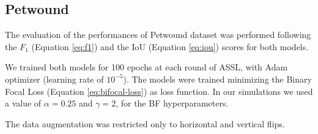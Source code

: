 \documentclass[../main.tex]{subfiles}
\begin{document}
\subsection{Petwound}

The evaluation of the performances of Petwound dataset was performed following the $F_{1}$ (Equation \ref{eq:f1}) and the IoU (Equation \ref{eq:iou}) scores for both models. 

We trained both models for 100 epochs at each round of ASSL, with Adam optimizer (learning rate of $10^{-5}$). The models were trained minimizing the Binary Focal Loss (Equation \ref{eq:bifocal-loss}) as loss function.
In our simulations we used a value of $\alpha=0.25$ and $\gamma=2$, for the BF hyperparameters.

The data augmentation was restricted only to horizontal and vertical flips.
\end{document}
